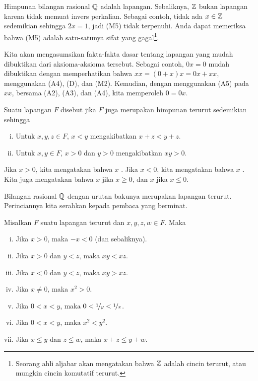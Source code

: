 \begin{example}
Himpunan bilangan rasional ${\mathbb{Q}}$ adalah lapangan.  Sebaliknya, ${\mathbb{Z}}$ bukan
lapangan karena tidak memuat invers perkalian.  Sebagai contoh,
tidak ada $x \in {\mathbb{Z}}$ sedemikian sehingga $2x = 1$, jadi (M5) tidak terpenuhi.  Anda
dapat memeriksa bahwa (M5) adalah satu-satunya sifat yang gagal\footnote{Seorang ahli aljabar akan mengatakan bahwa ${\mathbb{Z}}$ adalah
cincin terurut, atau mungkin cincin komutatif terurut.}.
\end{example}

Kita akan mengasumsikan fakta-fakta dasar tentang lapangan yang mudah
dibuktikan dari aksioma-aksioma tersebut.  Sebagai contoh, $0x = 0$ mudah dibuktikan
dengan memperhatikan bahwa $xx = (0+x)x = 0x+xx$, menggunakan (A4), (D)\@, dan (M2).  Kemudian,
dengan menggunakan (A5) pada $xx$, bersama (A2), (A3), dan (A4), kita memperoleh $0 = 0x$.

\begin{defn}
Suatu lapangan $F$ disebut \emph{} jika
$F$ juga merupakan himpunan terurut sedemikian sehingga
\begin{enumerate}[(i)]
\item \label{defn:ordfield:i} Untuk $x,y,z \in F$, $x < y$ mengakibatkan $x+z <
y+z$.
\item \label{defn:ordfield:ii} Untuk $x,y \in F$, $x > 0$ dan $y > 0$
mengakibatkan $xy > 0$.
\end{enumerate}
Jika $x > 0$, kita mengatakan bahwa $x$ \emph{}.
Jika $x < 0$, kita mengatakan bahwa $x$ \emph{}.
Kita juga mengatakan bahwa $x$ \emph{} jika $x \geq 0$,
dan $x$ \emph{} jika $x \leq 0$.
\end{defn}

Bilangan rasional ${\mathbb{Q}}$ dengan urutan bakunya merupakan lapangan terurut.
Perinciannya kita serahkan kepada pembaca yang berminat.

\begin{prop} \label{prop:bordfield}
Misalkan $F$ suatu lapangan terurut dan $x,y,z,w \in F$.  Maka
\begin{enumerate}[(i)]
\item \label{prop:bordfield:i} Jika $x > 0$, maka $-x < 0$ (dan sebaliknya).
\item \label{prop:bordfield:ii} Jika $x > 0$ dan $y < z$, maka $xy < xz$.
\item \label{prop:bordfield:iii} Jika $x < 0$ dan $y < z$, maka $xy > xz$.
\item \label{prop:bordfield:iv} Jika $x \neq 0$, maka $x^2 > 0$.
\item \label{prop:bordfield:v} Jika $0 < x < y$, maka $0 < \nicefrac{1}{y} < \nicefrac{1}{x}$.
\item \label{prop:bordfield:vi} Jika $0 < x < y$, maka $x^2 < y^2$.
\item \label{prop:bordfield:vii} Jika $x \leq y$ dan $z \leq w$, maka $x + z \leq y + w$.
\end{enumerate}
\end{prop}

